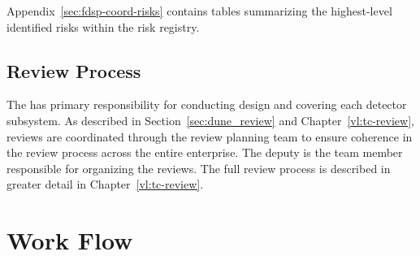 Appendix~\ref{sec:fdsp-coord-risks} contains tables summarizing the 
highest-level identified risks within the  risk registry.

\subsection{Review Process}

The  has primary responsibility for conducting design 
and  covering each detector subsystem.  As 
described in Section~\ref{sec:dune_review} and Chapter~\ref{vl:tc-review}, 
reviews are coordinated through the  review planning team to 
ensure coherence in the review process across the entire  
enterprise.  The deputy  is the  
team member responsible for organizing the reviews.  The full review process is 
described in greater detail in Chapter~\ref{vl:tc-review}.

\section{ Work Flow}
\label{sec:workflow}

